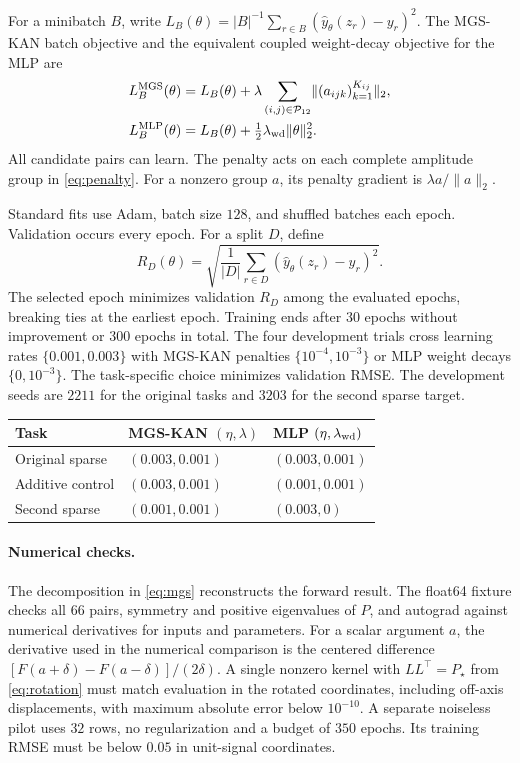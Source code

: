 \documentclass[11pt]{article}
\newcommand{\norm}[1]{\lVert #1\rVert}
\newcommand{\setP}{\mathcal{P}}
\begin{document}
For a minibatch \(B\), write
\(L_B(\theta)=|B|^{-1}\sum_{r\in B}(\widehat y_\theta(z_r)-y_r)^2\).
The MGS-KAN batch objective and the equivalent coupled weight-decay
objective for the MLP are
\begin{align}
 L_B^{\rm MGS}(\theta)
   &=L_B(\theta)+\lambda \sum_{(i,j)\in\setP_{12}}
           \norm{(a_{ijk})_{k=1}^{K_{ij}}}_2,\label{eq:penalty}\\
 L_B^{\rm MLP}(\theta)
   &=L_B(\theta)+\tfrac12\lambda_{\rm wd}\norm{\theta}_2^2.\nonumber
\end{align}
All candidate pairs can learn. The penalty acts on each complete amplitude
group in \eqref{eq:penalty}. For a nonzero group \(a\), its penalty gradient
is \(\lambda a/\norm{a}_2\).

Standard fits use Adam, batch size \(128\), and shuffled batches each epoch.
Validation occurs every epoch. For a split \(D\), define
\begin{equation}
 R_D(\theta)=
 \sqrt{\frac{1}{|D|}\sum_{r\in D}(\widehat y_\theta(z_r)-y_r)^2}.
 \label{eq:rmse}
\end{equation}
The selected epoch minimizes validation \(R_D\) among the evaluated
epochs, breaking ties at the earliest epoch. Training ends after
\(30\) epochs without improvement or \(300\) epochs in total.
The four development trials cross learning rates \(\{0.001,0.003\}\)
with MGS-KAN penalties \(\{10^{-4},10^{-3}\}\) or MLP weight decays
\(\{0,10^{-3}\}\). The task-specific choice minimizes validation RMSE.
The development seeds are \(2211\) for the original tasks and \(3203\)
for the second sparse target.

\begin{center}
\begin{tabular}{@{}lll@{}}
\toprule
Task & MGS-KAN \((\eta,\lambda)\) & MLP \((\eta,\lambda_{\rm wd})\)\\
\midrule
Original sparse & \((0.003,0.001)\) & \((0.003,0.001)\)\\
Additive control & \((0.003,0.001)\) & \((0.001,0.001)\)\\
Second sparse & \((0.001,0.001)\) & \((0.003,0)\)\\
\bottomrule
\end{tabular}
\end{center}

\paragraph{Numerical checks.}
The decomposition in \eqref{eq:mgs} reconstructs the forward result.
The float64 fixture checks all \(66\) pairs, symmetry and positive
eigenvalues of \(P\), and autograd against numerical derivatives for
inputs and parameters. For a scalar argument \(a\), the derivative used
in the numerical comparison is the centered difference
\([F(a+\delta)-F(a-\delta)]/(2\delta)\). A single nonzero kernel with
\(LL^\top=P_\star\) from \eqref{eq:rotation} must match evaluation in
the rotated coordinates, including off-axis displacements, with maximum
absolute error below \(10^{-10}\). A separate noiseless pilot uses \(32\)
rows, no regularization and a budget of \(350\) epochs. Its training
RMSE must be below \(0.05\) in unit-signal coordinates.
\end{document}
